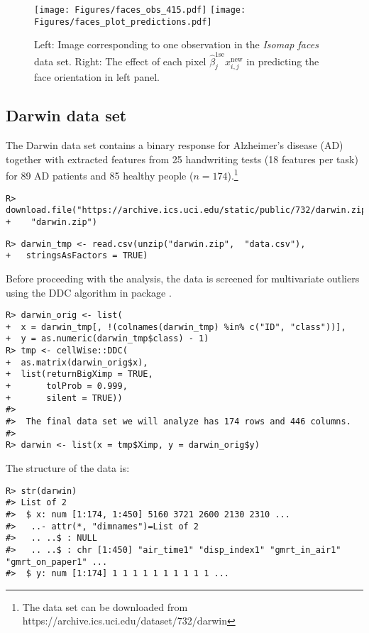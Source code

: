 \documentclass[
  article,
  nojss]{jss}
\begin{document}
\begin{figure}[t!]
\centering
\texttt{[image: Figures/faces\_obs\_415.pdf]}
\texttt{[image: Figures/faces\_plot\_predictions.pdf]}
\caption{Left: Image corresponding to one observation in the \emph{Isomap faces} data set. Right: The effect of each pixel $\hat\beta^\text{1se}_j x^\text{new}_{i,j}$ in predicting the face orientation in left panel. \label{fig:faces_predictions}}
\end{figure}

\subsection{Darwin data set}\label{darwin-data-set}

The Darwin data set \citep{CILIA2022darwin} contains a binary response
for Alzheimer's disease (AD) together with extracted features from 25
handwriting tests (18 features per task) for 89 AD patients and 85
healthy people
(\(n=174\)).\footnote{The data set can be downloaded from  https://archive.ics.uci.edu/dataset/732/darwin}

\begin{verbatim}
R> download.file("https://archive.ics.uci.edu/static/public/732/darwin.zip",
+    "darwin.zip")
\end{verbatim}

\begin{verbatim}
R> darwin_tmp <- read.csv(unzip("darwin.zip",  "data.csv"), 
+   stringsAsFactors = TRUE)
\end{verbatim}

Before proceeding with the analysis, the data is screened for
multivariate outliers using the DDC algorithm in package 
\citep{rcellwise}.

\begin{verbatim}
R> darwin_orig <- list(
+  x = darwin_tmp[, !(colnames(darwin_tmp) %in% c("ID", "class"))],
+  y = as.numeric(darwin_tmp$class) - 1)
R> tmp <- cellWise::DDC(
+  as.matrix(darwin_orig$x),
+  list(returnBigXimp = TRUE, 
+       tolProb = 0.999,
+       silent = TRUE))
#>  
#>  The final data set we will analyze has 174 rows and 446 columns.
#> 
R> darwin <- list(x = tmp$Ximp, y = darwin_orig$y)
\end{verbatim}

The structure of the data is:

\begin{verbatim}
R> str(darwin)
#> List of 2
#>  $ x: num [1:174, 1:450] 5160 3721 2600 2130 2310 ...
#>   ..- attr(*, "dimnames")=List of 2
#>   .. ..$ : NULL
#>   .. ..$ : chr [1:450] "air_time1" "disp_index1" "gmrt_in_air1" "gmrt_on_paper1" ...
#>  $ y: num [1:174] 1 1 1 1 1 1 1 1 1 1 ...
\end{verbatim}
\end{document}
